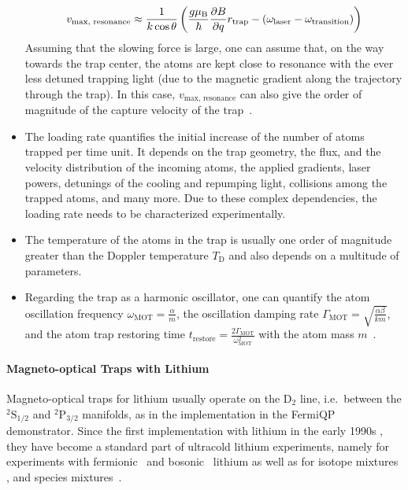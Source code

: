 \begin{itemize}
    \begin{align}\label{eq:resonance_velocity}
        v_\text{max, resonance} \approx \frac{1}{k \cos \theta}
        \left(
            \frac{g \mu_\text{B}}{\hbar} \pdv{B}{q} r_\text{trap} - \left(\omega_\text{laser} - \omega_\text{transition}\right)
        \right)
    \end{align}
    Assuming that the slowing force is large, one can assume that, on the way towards the trap center, the atoms are kept close to resonance with the ever less detuned trapping light (due to the magnetic gradient along the trajectory through the trap). In this case, $v_\text{max, resonance}$ can also give the order of magnitude of the capture velocity of the trap~\cite{tiecke_high-flux_2009}.
    \item The loading rate quantifies the initial increase of the number of atoms trapped per time unit. It depends on the trap geometry, the flux, and the velocity distribution of the incoming atoms, the applied gradients, laser powers, detunings of the cooling and repumping light, collisions among the trapped atoms, and many more. Due to these complex dependencies, the loading rate needs to be characterized experimentally.
    \item The temperature of the atoms in the trap is usually one order of magnitude greater than the Doppler temperature $T_\text{D}$ and also depends on a multitude of parameters.
    \item Regarding the trap as a harmonic oscillator, one can quantify the atom oscillation frequency $\omega_\text{MOT} = \frac{\alpha}{m}$, the oscillation damping rate $\Gamma_\text{MOT} = \sqrt{\frac{\alpha \beta}{km}}$, and the atom trap restoring time $t_\text{restore} = \frac{2\Gamma_\text{MOT}}{\omega_\text{MOT}^2}$ with the atom mass $m$~\cite{metcalf_laser_1999}.
\end{itemize}

\paragraph{Magneto-optical Traps with Lithium}\label{ch:3d_mots_with_li}
Magneto-optical traps for lithium usually operate on the D$_2$ line, i.e.~between the $^2\text{S}_{1/2}$ and $^2\text{P}_{3/2}$ manifolds, as in the implementation in the FermiQP demonstrator. Since the first implementation with lithium in the early 1990s \cite{kawanaka_decay_1993}, they have become a standard part of ultracold lithium experiments, namely for experiments with fermionic~\cite{duarte_all-optical_2011,omran_microscopic_2015} and bosonic~\cite{kawanaka_decay_1993,schunemann_magneto-optic_1998} lithium as well as for isotope mixtures \cite{mewes_simultaneous_1999, schreck_sympathetic_2001, hilker_laser_2012, kerkmann_novel_2019}, and species mixtures~\cite{ladouceur_compact_2009,tiecke_high-flux_2009,chen_lithium-cesium_2021}.

